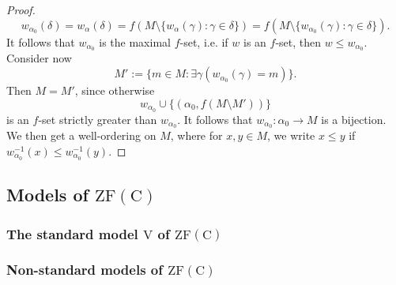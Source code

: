 \begin{proof}
    $$w_{\alpha_0}(\delta)=w_{\alpha}(\delta)=f(M\setminus \{w_\alpha(\gamma) : \gamma \in \delta\})=f(M\setminus \{w_{\alpha_0}(\gamma) : \gamma\in \delta\}).$$
    It follows that $w_{\alpha_0}$ is the maximal $f$-set, i.e. if $w$ is an $f$-set, then $w\leq w_{\alpha_0}$. Consider now 
    $$M':=\{m\in M : \exists \gamma(w_{\alpha_0}(\gamma)=m)\}.$$
    Then $M=M'$, since otherwise 
    $$w_{\alpha_0}\cup \{(\alpha_0, f(M\setminus M'))\}$$
    is an $f$-set strictly greater than $w_{\alpha_0}$. It follows that $w_{\alpha_0}:\alpha_0\rightarrow M$ is a bijection. We then get a well-ordering on $M$, where for $x,y\in M$, we write $x\leq y$ if $w_{\alpha_0}^{-1}(x)\leq w_{\alpha_0}^{-1}(y)$.
\end{proof}
\subsection{Models of $\mathrm{ZF(C)}$}
\subsubsection{The standard model $\mathrm{V}$ of $\mathrm{ZF(C)}$}
\subsubsection{Non-standard models of $\mathrm{ZF(C)}$}
